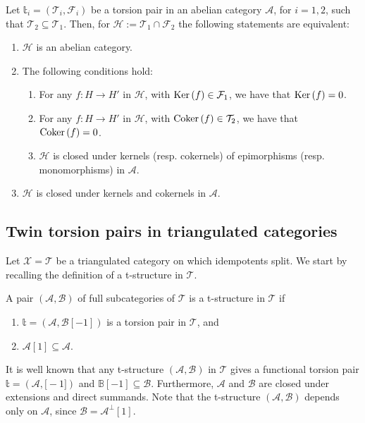 \begin{thm}
  Let $\mathbb{t}_i=(\mathcal{T}_i,\mathcal{F}_i)$ be a torsion pair in an abelian category
  $\mathcal{A}$, for $i=1,2$, such that $\mathcal{T}_2\subseteq \mathcal{T}_1$. Then, for
  $\mathcal{H}:=\mathcal{T}_1\cap\mathcal{F}_2$ the following statements are equivalent:
  \begin{enumerate}[label=(\alph*)]
    \item $\mathcal{H}$ is an abelian category.
    \item The following conditions hold:
      \begin{enumerate}[label=(\alph{enumi}\arabic*)]
        \item For any $f:H\to H'$ in $\mathcal{H}$, with $\mathrm{\textup{Ker\,}}(f)\in\mathcal{F}_1$,
        we have that $\mathrm{\textup{Ker\,}}(f)=0$.
        \item For any $f:H\to H'$ in $\mathcal{H}$, with $\mathrm{\textup{Coker\,}}(f)\in\mathcal{T}_2$,
        we have that $\mathrm{\textup{Coker\,}}(f)=0$.
        \item $\mathcal{H}$ is closed under kernels (resp. cokernels) of epimorphisms
        (resp. monomorphisms) in $\mathcal{A}$.
      \end{enumerate}
    \item $\mathcal{H}$ is closed under kernels and cokernels in $\mathcal{A}$.
  \end{enumerate}
\end{thm}

\subsection{Twin torsion pairs in triangulated categories}

Let $\mathcal{X}=\mathcal{T}$ be a triangulated category on which idempotents split.
We start by recalling the definition of a t-structure in $\mathcal{T}$.

\begin{definition}
  A pair $(\mathcal{A},\mathcal{B})$ of full subcategories of $\mathcal{T}$ is a t-structure
  in $\mathcal{T}$ if
  \begin{enumerate}[label=(\alph*)]
    \item $\mathbb{t}=(\mathcal{A},\mathcal{B}[-1])$ is a torsion pair in $\mathcal{T}$, and
    \item $\mathcal{A}[1]\subseteq \mathcal{A}$.
  \end{enumerate}
\end{definition}

\begin{rmk}
  It is well known that any t-structure $(\mathcal{A},\mathcal{B})$ in $\mathcal{T}$
  gives a functional torsion pair $\mathbb{t}=(\mathcal{A},\mathcal[-1])$ and
  $\mathbb{B}[-1]\subseteq\mathcal{B}$. Furthermore, $\mathcal{A}$ and
  $\mathcal{B}$ are closed under extensions and direct summands. Note that the t-structure
  $(\mathcal{A},\mathcal{B})$ depends only on $\mathcal{A}$, since $\mathcal{B}=\mathcal{A}^\perp[1]$.
\end{rmk}

